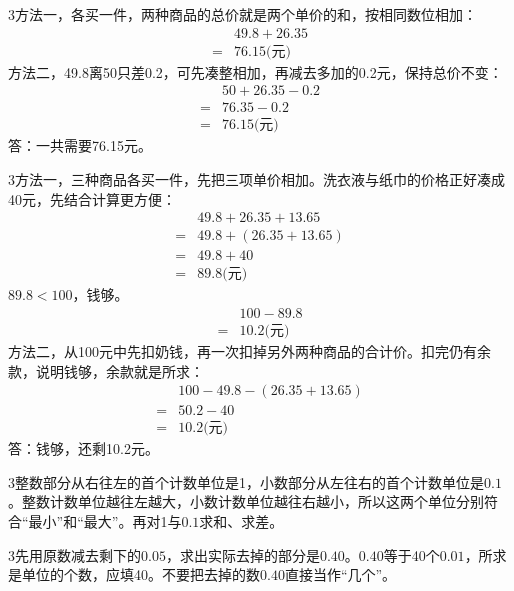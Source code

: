 \documentclass[multi=snippet,border={5bp 20bp 5bp 5bp}]{standalone}
\newenvironment{snippet}[3]{\begin{minipage}{#1bp}\color{answerred}\fontsize{#2}{#3}\selectfont\raggedright}{\end{minipage}}
\begin{document}
\begin{snippet}{505}{11.5}{14}\begin{multicols}{3}\raggedcolumns 方法一，各买一件，两种商品的总价就是两个单价的和，按相同数位相加：\[\begin{aligned}&49.8+26.35\\={}&76.15\text{(元)}\end{aligned}\]方法二，49.8离50只差0.2，可先凑整相加，再减去多加的0.2元，保持总价不变：\[\begin{aligned}&50+26.35-0.2\\={}&76.35-0.2\\={}&76.15\text{(元)}\end{aligned}\]答：一共需要76.15元。\end{multicols}\end{snippet}
\begin{snippet}{505}{11.5}{14}\begin{multicols}{3}\raggedcolumns 方法一，三种商品各买一件，先把三项单价相加。洗衣液与纸巾的价格正好凑成40元，先结合计算更方便：\[\begin{aligned}&49.8+26.35+13.65\\={}&49.8+(26.35+13.65)\\={}&49.8+40\\={}&89.8\text{(元)}\end{aligned}\]\(89.8<100\)\allowbreak ，钱够。\[\begin{aligned}&100-89.8\\={}&10.2\text{(元)}\end{aligned}\]方法二，从100元中先扣奶钱，再一次扣掉另外两种商品的合计价。扣完仍有余款，说明钱够，余款就是所求：\[\begin{aligned}&100-49.8-(26.35+13.65)\\={}&50.2-40\\={}&10.2\text{(元)}\end{aligned}\]答：钱够，还剩10.2元。\end{multicols}\end{snippet}
\begin{snippet}{505}{11.5}{14}\begin{multicols}{3}\raggedcolumns 整数部分从右往左的首个计数单位是1，小数部分从左往右的首个计数单位是\(0.1\)\allowbreak 。整数计数单位越往左越大，小数计数单位越往右越小，所以这两个单位分别符合“最小”和“最大”。再对1与\(0.1\)\allowbreak 求和、求差。\end{multicols}\end{snippet}
\begin{snippet}{505}{11.5}{14}\begin{multicols}{3}\raggedcolumns 先用原数减去剩下的\(0.05\)\allowbreak ，求出实际去掉的部分是\(0.40\)\allowbreak 。\(0.40\)\allowbreak 等于40个\(0.01\)\allowbreak ，所求是单位的个数，应填40。不要把去掉的数\(0.40\)\allowbreak 直接当作“几个”。\end{multicols}\end{snippet}
\end{document}
